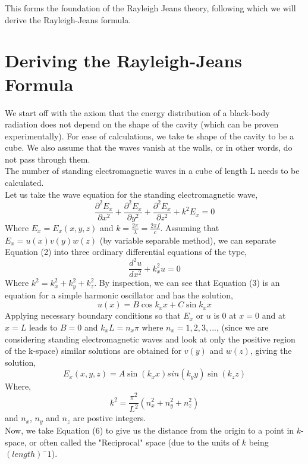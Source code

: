 \noindent This forms the foundation of the Rayleigh Jeans theory, following which we will derive the Rayleigh-Jeans formula.

\newpage
\section{Deriving the Rayleigh-Jeans Formula}
We start off with the axiom that the energy distribution of a black-body radiation does not depend on the shape of the cavity (which can be proven experimentally). For ease of calculations, we take te shape of the cavity to be a cube. We also assume that the waves vanish at the walls, or in other words, do not pass through them.\\
\noindent The number of standing electromagnetic waves in a cube of length L needs to be calculated. \\
Let us take the wave equation for the standing electromagnetic wave,
\begin{equation}
	\frac{\partial^2E_x}{\partial x^2}+\frac{\partial^2E_x}{\partial y^2}+\frac{\partial^2E_x}{\partial z^2}+k^2E_x=0
\end{equation}
Where $E_x=E_x(x,y,z)$ and $k=\frac{2\pi}{\lambda}=\frac{2\pi f}{c}$.
Assuming that $E_x=u(x)v(y)w(z)$ (by variable separable method), we can separate Equation (2) into three ordinary differential equations of the type,
\begin{equation}
	\frac{d^2u}{dx^2}+k^2_xu=0
\end{equation}
Where $k^2=k^2_x+k^2_y+k^2_z$. By inspection, we can see that Equation (3) is an equation for a simple harmonic oscillator and has the solution,
\begin{equation}
	u(x)=B\cos k_xx+C\sin k_xx
\end{equation}
Applying necessary boundary conditions so that $E_x$ or $u$ is 0 at $x=0$ and at $x=L$ leads to $B=0$ and $k_xL=n_x\pi$ where $n_x=1,2,3,...$, (since we are considering standing electromagnetic waves and look at only the positive region of the k-space) similar solutions are obtained for $v(y)$ and $w(z)$, giving the solution,
\begin{equation}
	E_x(x,y,z)=A\sin (k_xx)sin(k_yy)\sin(k_zz)
\end{equation}
Where,
\begin{equation}
	k^2=\frac{\pi ^2}{L^2}(n^2_x+n^2_y+n^2_z)
\end{equation}
and $n_x$, $n_y$ and $n_z$ are postive integers.\\
Now, we take Equation (6) to give us the distance from the origin to a point in $k$-space, or often called the "Reciprocal" space (due to the units of $k$ being $(length)^-1$).\\
